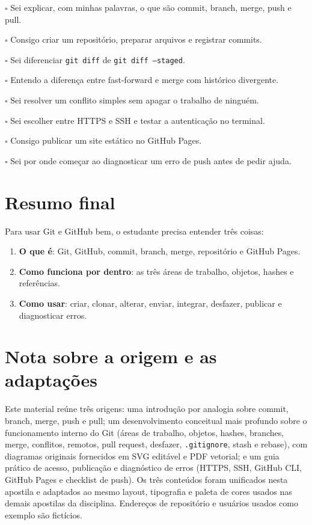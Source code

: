 \documentclass[11pt,a4paper]{article}
\begin{document}
\begin{tcolorbox}[title={QUADRO DE VERIFICAÇÃO}]
$\square$ Sei explicar, com minhas palavras, o que são commit, branch, merge, push e pull.\par
$\square$ Consigo criar um repositório, preparar arquivos e registrar commits.\par
$\square$ Sei diferenciar \texttt{git diff} de \texttt{git diff --staged}.\par
$\square$ Entendo a diferença entre fast-forward e merge com histórico divergente.\par
$\square$ Sei resolver um conflito simples sem apagar o trabalho de ninguém.\par
$\square$ Sei escolher entre HTTPS e SSH e testar a autenticação no terminal.\par
$\square$ Consigo publicar um site estático no GitHub Pages.\par
$\square$ Sei por onde começar ao diagnosticar um erro de push antes de pedir ajuda.\par
\end{tcolorbox}

\section*{Resumo final}
\begin{tcolorbox}[title={RESUMO}]
Para usar Git e GitHub bem, o estudante precisa entender três coisas:
\begin{enumerate}
\item \textbf{O que é}: Git, GitHub, commit, branch, merge, repositório e GitHub Pages.
\item \textbf{Como funciona por dentro}: as três áreas de trabalho, objetos, hashes e referências.
\item \textbf{Como usar}: criar, clonar, alterar, enviar, integrar, desfazer, publicar e diagnosticar erros.
\end{enumerate}
\end{tcolorbox}

\section*{Nota sobre a origem e as adaptações}
Este material reúne três origens: uma introdução por analogia sobre commit, branch, merge, push e pull; um desenvolvimento conceitual mais profundo sobre o funcionamento interno do Git (áreas de trabalho, objetos, hashes, branches, merge, conflitos, remotos, pull request, desfazer, \texttt{.gitignore}, stash e rebase), com diagramas originais fornecidos em SVG editável e PDF vetorial; e um guia prático de acesso, publicação e diagnóstico de erros (HTTPS, SSH, GitHub CLI, GitHub Pages e checklist de push). Os três conteúdos foram unificados nesta apostila e adaptados ao mesmo layout, tipografia e paleta de cores usados nas demais apostilas da disciplina. Endereços de repositório e usuários usados como exemplo são fictícios.
\end{document}
